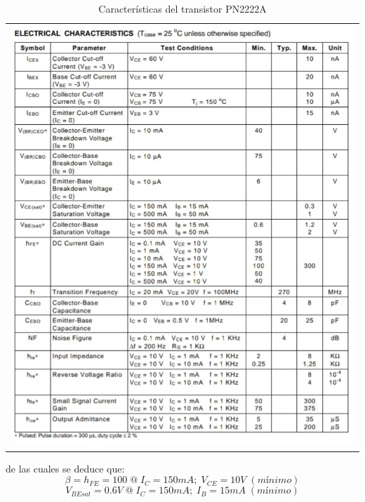 \documentclass[10pt, a4paper]{article}
\begin{document}
    \begin{table}[h!]
        \centering
        \caption{Características del transistor PN2222A} %
        \label{tab:especificaciones} %
        \begin{tabular}{c}
            \includegraphics[height=20cm\textwidth]{pn2222a.jpg} \\
        \end{tabular}
    \end{table}

    \newpage
    
    de las cuales se deduce que:
    $$\beta = h_{FE} = 100 \; @ \; I_C = 150mA; \; V_{CE} = 10V \; (mínimo)$$
    $$V_{BEsat} = 0.6V \; @ \; I_C = 150mA; \; I_B = 15mA \; (mínimo)$$
\end{document}
